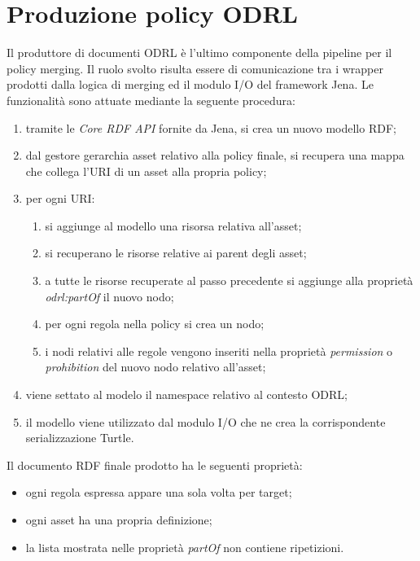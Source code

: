 \documentclass[12pt,a4paper,twoside]{book}
\begin{document}
\section{Produzione policy ODRL}\label{produceSection}
Il produttore di documenti ODRL è l'ultimo componente della pipeline per il policy merging. Il ruolo svolto risulta essere di comunicazione tra i wrapper prodotti dalla logica di merging ed il modulo I/O del framework Jena. Le funzionalità sono attuate mediante la seguente procedura:
\begin{enumerate}
\item tramite le \textit{Core RDF API} fornite da Jena, si crea un nuovo modello RDF;
\item dal gestore gerarchia asset relativo alla policy finale, si recupera una mappa che collega l'URI di un asset alla propria policy;
\item per ogni URI:
\begin{enumerate}
\item si aggiunge al modello una risorsa relativa all'asset;
\item si recuperano le risorse relative ai parent degli asset;
\item a tutte le risorse recuperate al passo precedente si aggiunge alla proprietà \textit{odrl:partOf} il nuovo nodo;
\item per ogni regola nella policy si crea un nodo;
\item i nodi relativi alle regole vengono inseriti nella proprietà \textit{permission} o \textit{prohibition} del nuovo nodo relativo all'asset;
\end{enumerate}
\item viene settato al modelo il namespace relativo al contesto ODRL;
\item il modello viene utilizzato dal modulo I/O che ne crea la corrispondente serializzazione Turtle.
\end{enumerate}
Il documento RDF finale prodotto ha le seguenti proprietà:
\begin{itemize}
\item ogni regola espressa appare una sola volta per target;
\item ogni asset ha una propria definizione;
\item la lista mostrata nelle proprietà \textit{partOf} non contiene ripetizioni.
\end{itemize}
\end{document}
